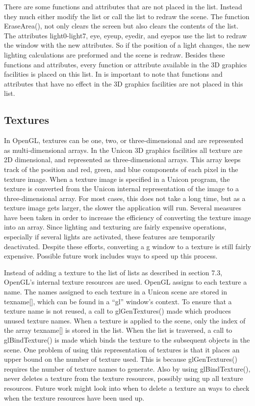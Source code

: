 There are some functions and attributes that are not placed in the
list. Instead they much either modify the list or call the list to
redraw the scene. The function \textsf{EraseArea()}, not only clears
the screen but also clears the contents of the list. The attributes
\textsf{light0-light7}, \textsf{eye}, \textsf{eyeup}, \textsf{eyedir},
and \textsf{eyepos} use the list to redraw the window with the new
attributes. So if the position of a light changes, the new lighting
calculations are preformed and the scene is redraw. Besides these
functions and attributes, every function or attribute available in the
3D graphics facilities is placed on this list. In is important to note
that functions and attributes that have no effect in the 3D graphics
facilities are not placed in this list.

\subsection[Textures]{\bfseries Textures}

In OpenGL, textures can be one, two, or three-dimensional and are
represented as multi-dimensional arrays. In the Unicon 3D graphics
facilities all texture are 2D dimensional, and represented as
three-dimensional arrays. This array keeps track of the position and
red, green, and blue components of each pixel in the texture
image. When a texture image is specified in a Unicon program, the
texture is converted from the Unicon internal representation of the
image to a three-dimensional array. For most cases, this does not take
a long time, but as a texture image gets larger, the slower the
application will run. Several measures have been taken in order to
increase the efficiency of converting the texture image into an
array. Since lighting and texturing are fairly expensive operations,
especially if several lights are activated, these features are
temporarily deactivated. Despite these efforts, converting a
{\textquotedbl}\textsf{g{\textquotedbl}} window to a texture is still
fairly expensive. Possible future work includes ways to speed up this
process.

Instead of adding a texture to the list of lists as described in
section 7.3, OpenGL's internal texture resources are used. OpenGL
assigns to each texture a name. The names assigned to each texture in
a Unicon scene are stored in \textsf{texname[]}, which can be found in
a \textsf{``gl''} window's context. To ensure that a texture name is
not reused, a call to \textsf{glGenTextures()} made which produces
unused texture names. When a texture is applied to the scene, only the
index of the array \textsf{texname[]} is stored in the list. When the
list is traversed, a call to \textsf{glBindTexture()} is made which
binds the texture to the subsequent objects in the scene. One problem
of using this representation of textures is that it places an upper
bound on the number of texture used. This is because
\textsf{glGenTextures()} requires the number of texture names to
generate. Also by using \textsf{glBindTexture()}, never deletes a
texture from the texture resources, possibly using up all texture
resources. Future work might look into when to delete a texture an
ways to check when the texture resources have been used up.

